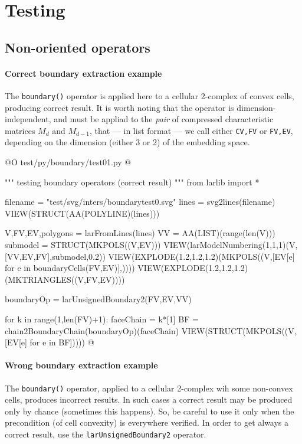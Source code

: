 \documentclass[11pt,oneside]{article}	%
\begin{document}
\section{Testing}

\subsection{Non-oriented operators}

\paragraph{Correct boundary extraction example}

The \texttt{boundary()} operator is applied here to a cellular 2-complex of convex cells, producing correct result. It is worth noting that the operator is dimension-independent, and must be appliad to the \emph{pair} of compressed characteristic matrices $M_d$ and $M_{d-1}$, that --- in list format --- we call either \texttt{CV,FV} or  \texttt{FV,EV}, depending on the dimension (either 3 or 2) of the embedding space.

@O test/py/boundary/test01.py
@{""" testing boundary operators (correct result) """
from larlib import *

filename = "test/svg/inters/boundarytest0.svg"
lines = svg2lines(filename)
VIEW(STRUCT(AA(POLYLINE)(lines)))
    
V,FV,EV,polygons = larFromLines(lines)
VV = AA(LIST)(range(len(V)))
submodel = STRUCT(MKPOLS((V,EV)))
VIEW(larModelNumbering(1,1,1)(V,[VV,EV,FV],submodel,0.2))
VIEW(EXPLODE(1.2,1.2,1.2)(MKPOLS((V,[EV[e] for e in boundaryCells(FV,EV)],))))
VIEW(EXPLODE(1.2,1.2,1.2)(MKTRIANGLES((V,FV,EV))))

boundaryOp = larUnsignedBoundary2(FV,EV,VV)

for k in range(1,len(FV)+1):
    faceChain = k*[1]
    BF = chain2BoundaryChain(boundaryOp)(faceChain)
    VIEW(STRUCT(MKPOLS((V,[EV[e] for e in BF]))))
@}

\paragraph{Wrong boundary extraction example}

The \texttt{boundary()} operator, applied  to a cellular 2-complex wih some non-convex cells, produces incorrect results. In such cases a correct result may be produced only by chance (sometimes this happens). So, be careful to use it only when the precondition (of cell convexity) is everywhere verified. In order to get always a correct result, use the \texttt{larUnsignedBoundary2} operator.
\end{document}
